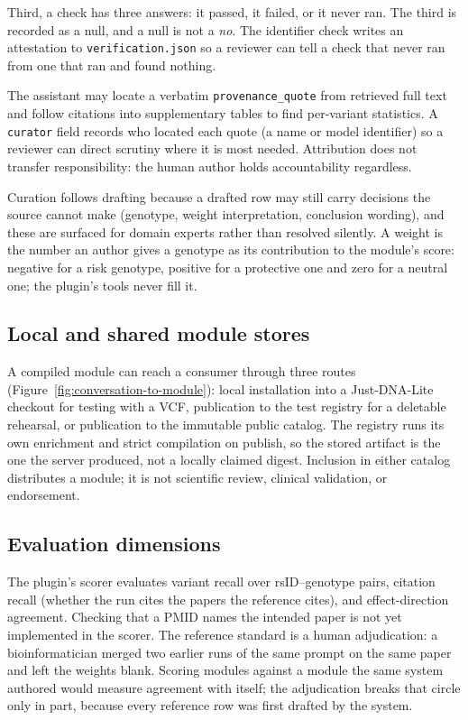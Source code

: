\documentclass[11pt,a4paper]{article}
\begin{document}
Third, a check has three answers: it passed, it failed, or it never
ran. The third is recorded as a null, and a null is not a \emph{no}. The
identifier check writes an attestation to \texttt{verification.json} so a
reviewer can tell a check that never ran from one that ran and found nothing.

The assistant may locate a verbatim \texttt{provenance\_quote} from retrieved
full text and follow citations into supplementary tables to find per-variant
statistics. A \texttt{curator} field records who located each quote (a name
or model identifier) so a reviewer can direct scrutiny where it is most
needed. Attribution does not transfer responsibility: the human author holds
accountability regardless.

Curation follows drafting because a drafted row may still carry decisions the
source cannot make (genotype, weight interpretation, conclusion wording), and
these are surfaced for domain experts rather than resolved silently.
A weight is the number an author gives a genotype as its contribution to
the module's score: negative for a risk genotype, positive for a protective
one and zero for a neutral one; the plugin's tools never fill it.

\subsection{Local and shared module stores}

A compiled module can reach a consumer through three routes
(Figure~\ref{fig:conversation-to-module}): local installation into a Just-DNA-Lite
checkout for testing with a VCF, publication to the test registry for a
deletable rehearsal, or publication to the immutable public catalog. The registry runs its own enrichment and
strict compilation on publish, so the stored artifact is the one the server
produced, not a locally claimed digest. Inclusion in either catalog
distributes a module; it is not scientific review, clinical validation, or
endorsement.

\subsection{Evaluation dimensions}

The plugin's scorer evaluates variant recall over
rsID--genotype pairs, citation recall (whether the run cites the papers the
reference cites), and
effect-direction agreement. Checking that a PMID names the intended paper is
not yet implemented in the scorer. The reference standard is a human adjudication: a bioinformatician merged two
earlier runs of the same prompt on the same paper and left the weights blank.
Scoring modules against a module the same system authored would measure
agreement with itself; the adjudication breaks that circle only in part,
because every reference row was first drafted by the system.
\end{document}
